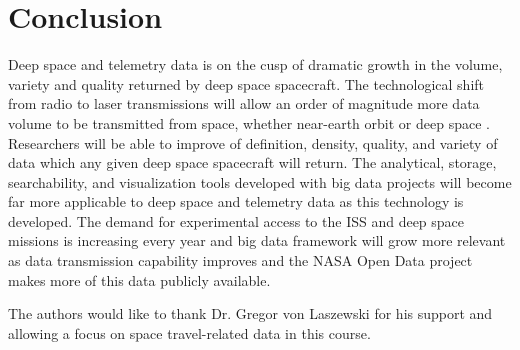 \documentclass[sigconf]{acmart}
\begin{document}
\section{Conclusion}
Deep space and telemetry data is on the cusp of dramatic growth in the volume, variety and quality returned by deep space spacecraft. The technological shift from radio to laser transmissions will allow an order of magnitude more data volume to be transmitted from space, whether near-earth orbit or deep space \cite{Jacobson2016}. Researchers will be able to improve of definition, density, quality, and variety of data which any given deep space spacecraft will return. The analytical, storage, searchability, and visualization tools developed with big data projects will become far more applicable to deep space and telemetry data as this technology is developed. The demand for experimental access to the ISS and deep space missions is increasing every year \cite{Jacobson2016,Betts2017} and big data framework will grow more relevant as data transmission capability improves and the NASA Open Data project makes more of this data publicly available. 

\begin{acks}

  The authors would like to thank Dr. Gregor von Laszewski for his
  support and allowing a focus on space travel-related data in this course. 

\end{acks}


 
\end{document}
